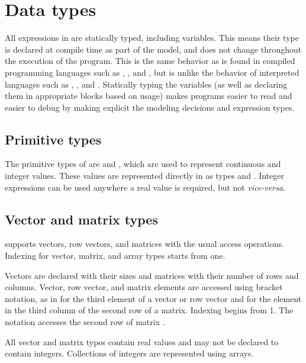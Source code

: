 \documentclass[article]{jss}
\begin{document}
\section{Data types}\label{data-types.section}

All expressions in  are statically typed, including
variables.  This means their type is declared at compile time as part
of the model, and does not change throughout the execution of the
program.  This is the same behavior as is found in compiled
programming languages such as , ,
and , but is unlike the behavior of interpreted
languages such as , , and
.  Statically typing the variables (as well as
declaring them in appropriate blocks based on usage) makes
 programs easier to read and easier to debug by making
explicit the modeling decisions and expression types.

\subsection{Primitive types}

The primitive types of  are  and ,
which are used to represent continuous and integer values.  These
values are represented directly in  as types
 and .  Integer expressions can be used
anywhere a real value is required, but not {\it vice-versa}.  

\subsection{Vector and matrix types}

 supports vectors, row vectors, and matrices with the
usual access operations.  Indexing for vector, matrix, and array types
starts from one.  

Vectors are declared with their sizes and matrices with their number
of rows and columns.  Vector, row vector, and matrix elements are
accessed using bracket notation, as in  for the third
element of a vector or row vector and  for the element in
the third column of the second row of a matrix.  Indexing begins from
1.  The notation  accesses the second row of matrix .

All vector and matrix types contain real values and may not be
declared to contain integers.  Collections of integers are represented
using arrays.
\end{document}
